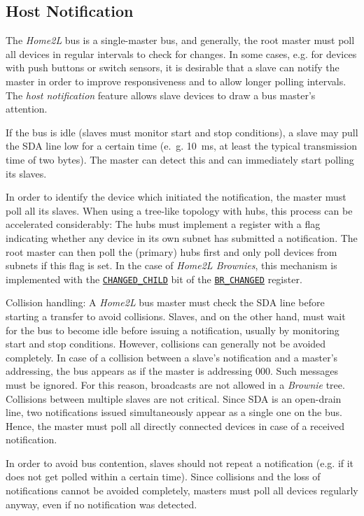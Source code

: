 \documentclass[12pt,english,parskip=half,headheight=19pt]{scrreprt}
\newcommand{\refapic}[1]{\href{home2l-api_c/index.html}{\mbox{\texttt{#1}}}}            %
\begin{document}
\subsection{Host Notification}
\label{sec:brownies-bus-notify}

The \textit{Home2L} bus is a single-master bus, and generally, the root master must poll all devices in regular intervals to check for changes. In some cases, e.g. for devices with push buttons or switch sensors, it is desirable that a slave can notify the master in order to improve responsiveness and to allow longer polling intervals. The \textit{host notification} feature allows slave devices to draw a bus master's attention.

If the bus is idle (slaves must monitor start and stop conditions), a slave may pull the SDA line low for a certain time (e.~g. 10~ms, at least the typical transmission time of two bytes). The master can detect this and can immediately start polling its slaves.

In order to identify the device which initiated the notification, the master must poll all its slaves. When using a tree-like topology with hubs, this process can be accelerated considerably: The hubs must implement a register with a flag indicating whether any device in its own subnet has submitted a notification. The root master can then poll the (primary) hubs first and only poll devices from subnets if this flag is set. In the case of \textit{Home2L Brownies}, this mechanism is implemented with the \refapic{CHANGED\_CHILD} bit of the \refapic{BR\_CHANGED} register.

Collision handling: A \textit{Home2L} bus master must check the SDA line before starting a transfer to avoid collisions. Slaves, and on the other hand, must wait for the bus to become idle before issuing a notification, usually by monitoring start and stop conditions. However, collisions can generally not be avoided completely. In case of a collision between a slave's notification and a master's addressing, the bus appears as if the master is addressing 000. Such messages must be ignored. For this reason, broadcasts are not allowed in a \textit{Brownie} tree. Collisions between multiple slaves are not critical. Since SDA is an open-drain line, two notifications issued simultaneously appear as a single one on the bus. Hence, the master must poll all directly connected devices in case of a received notification.

In order to avoid bus contention, slaves should not repeat a notification (e.g. if it does not get polled within a certain time). Since collisions and the loss of notifications cannot be avoided completely, masters must poll all devices regularly anyway, even if no notification was detected.
\end{document}
